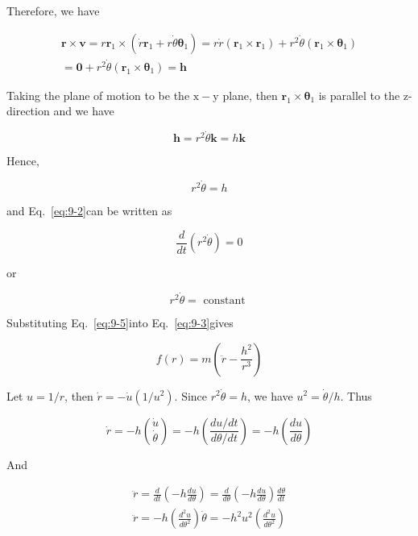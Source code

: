\documentclass[10pt]{article}
\numberwithin{equation}{section}
\begin{document}
Therefore, we have

$$
\begin{gathered}
\mathbf{r} \times \mathbf{v}=r \mathbf{r}_{1} \times\left(\dot{r} \mathbf{r}_{1}+r \dot{\theta} \boldsymbol{\theta}_{1}\right)=r \dot{r}\left(\mathbf{r}_{1} \times \mathbf{r}_{1}\right)+r^{2} \dot{\theta}\left(\mathbf{r}_{1} \times \boldsymbol{\theta}_{1}\right) \\
=\mathbf{0}+r^{2} \dot{\theta}\left(\mathbf{r}_{1} \times \boldsymbol{\theta}_{1}\right)=\mathbf{h}
\end{gathered}
$$

Taking the plane of motion to be the $\mathrm{x}-\mathrm{y}$ plane, then $\mathbf{r}_{1} \times \boldsymbol{\theta}_{1}$ is parallel to the z-direction and we have

$$
\mathbf{h}=r^{2} \dot{\theta} \mathbf{k}=h \mathbf{k}
$$

Hence,


\begin{equation}
r^{2} \dot{\theta}=h \label{eq:9-5}
\end{equation}


and Eq.~\eqref{eq:9-2}can be written as

$$
\frac{d}{d t}\left(r^{2} \dot{\theta}\right)=0
$$

or

$$
r^{2} \dot{\theta}=\text { constant }
$$

Substituting Eq.~\eqref{eq:9-5}into Eq.~\eqref{eq:9-3}gives


\begin{equation}
f(r)=m\left(\ddot{r}-\frac{h^{2}}{r^{3}}\right) \label{eq:9-6}
\end{equation}


Let $u=1 / r$, then $\dot{r}=-\dot{u}\left(1 / u^{2}\right)$. Since $r^{2} \dot{\theta}=h$, we have $u^{2}=\dot{\theta} / h$. Thus


\begin{equation}
\dot{r}=-h\binom{\dot{u}}{\dot{\theta}}=-h\left(\frac{d u / d t}{d \theta / d t}\right)=-h\left(\frac{d u}{d \theta}\right) \label{eq:9-7}
\end{equation}


And


\begin{gather}
\ddot{r}=\frac{d}{d t}\left(-h \frac{d u}{d \theta}\right)=\frac{d}{d \theta}\left(-h \frac{d u}{d \theta}\right) \frac{d \theta}{d t} \\
\ddot{r}=-h\left(\frac{d^{2} u}{d \theta^{2}}\right) \dot{\theta}=-h^{2} u^{2}\left(\frac{d^{2} u}{d \theta^{2}}\right) \label{eq:9-8}
\end{gather}
\end{document}

